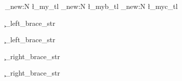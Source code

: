 
\ExplSyntaxOn
\tl_new:N \l_my_tl
\tl_new:N \l_myb_tl
\tl_new:N \l_myc_tl





\NewDocumentCommand{\csmetaformat} { } {
}


\NewDocumentCommand{\margdelimformat} { } {
																			\ttfamily\large\color{red}
}
\NewDocumentCommand{\margdelimleftformat} { } {
																			\margdelimformat
}
\NewDocumentCommand{\margdelimleftchar} { } {
																		  \c_left_brace_str
}
\NewDocumentCommand{\margdelimleft} { } {
																			{ 
																			\margdelimleftformat
																		  \margdelimleftchar
																		  }
}
\NewDocumentCommand{\margdelimleftreset} { } {
		
\RenewDocumentCommand{\margdelimformat} { } {
		\ttfamily\large\color{red}
	}
\RenewDocumentCommand{\margdelimleftformat} { } {
																			\margdelimformat
}
\RenewDocumentCommand{\margdelimleftchar} { } {
																		  \c_left_brace_str
}
\RenewDocumentCommand{\margdelimleft} { } {
																			{ 
																			\margdelimleftformat
																		  \margdelimleftchar
																		  }
}
		
}
\NewDocumentCommand{\margdelimrightreset} { } {
		
\RenewDocumentCommand{\margdelimformat} { } {
		\ttfamily\large\color{red}
	}
\RenewDocumentCommand{\margdelimrightformat} { } {
																			\margdelimformat
}
\RenewDocumentCommand{\margdelimrightchar} { } {
																		  \c_right_brace_str
}
\RenewDocumentCommand{\margdelimright} { } {
																			{ 
																			\margdelimrightformat
																		  \margdelimrightchar
																		  }
}
		
}

%
\NewDocumentCommand{\margreset} { } {
		\margdelimleftreset
		\margdelimrightreset		
}




\NewDocumentCommand{\margdelimrightformat} { } {
																			\margdelimformat
}
\NewDocumentCommand{\margdelimrightchar} { } {
																		  \c_right_brace_str
}
\NewDocumentCommand{\margdelimright} { } {
																			{ 
																			\margdelimrightformat
																		  \margdelimrightchar
																		  }
}


